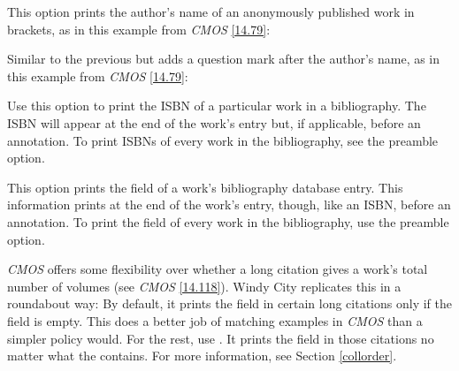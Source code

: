 \documentclass[11pt,letterpaper,oneside]{article}
\begin{document}
\begin{optionlist}


\noindent This option prints the author's name of an anonymously
published work in brackets, as in this example from \textit{CMOS}
\ref{14.79}:

\begin{citebib}
\item \cite{horsley1796}
\end{citebib}


\noindent Similar to the previous but adds a question mark after the
author's name, as in this example from \textit{CMOS} \ref{14.79}:

\begin{citebib}
\item \cite{hawkes1834}
\end{citebib}


\noindent Use this option to print the ISBN of a particular work in a
bibliography. The ISBN will appear at the end of the work's entry but,
if applicable, before an annotation. To print ISBNs of every work in
the bibliography, see the  preamble option.


\noindent This option prints the  field of a work's
bibliography database entry. This information prints at the end of the
work's entry, though, like an ISBN, before an annotation. To print the
 field of every work in the bibliography, use the
 preamble option.


\noindent \textit{CMOS} offers some flexibility over whether a long
citation gives a work's total number of volumes (see \textit{CMOS}
\ref{14.118}). Windy City replicates this in a roundabout way: By
default, it prints the  field in certain long
citations only if the  field is empty. This does a
better job of matching examples in \textit{CMOS} than a simpler policy
would. For the rest, use . It prints the
 field in those citations no matter what the
 contains. For more information, see Section
\ref{collorder}.


\end{optionlist}
\end{document}

